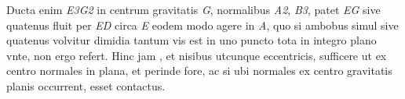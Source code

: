 Ducta enim \textit{E3G2} in centrum gravitatis \textit{G}, 
normalibus \textit{A2}, \textit{B3}, patet \textit{EG} sive quatenus fluit
per \textit{ED} circa \textit{E} eodem modo agere in \textit{A}, quo  
si ambobus simul sive quatenus volvitur dimidia tantum vis 
est in uno puncto tota in integro plano 
vnte, non ergo refert. 
\pend
\pstart
Hinc jam 
, et nisibus utcunque eccentricis, 
sufficere ut ex centro 
normales in plana, et perinde fore, ac si ubi normales 
ex centro gravitatis planis occurrent, esset contactus.
\pend
